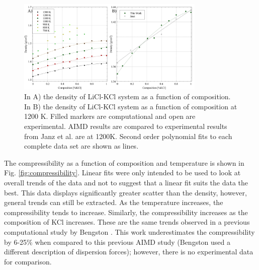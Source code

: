 \documentclass[review]{elsarticle}
\begin{document}
\begin{figure}[h]
 \centering
 \includegraphics[width=0.8\textwidth]{images/denisty_combined_figures.jpg} 
 \caption{In A) the density of LiCl-KCl system as a function of composition. In B) the density of LiCl-KCl system as a function of composition at 1200 K. Filled markers are computational and open are experimental. AIMD results are compared to experimental results from Janz et al. \cite{janz1975molten,van1955electrical} are at 1200K. Second order polynomial fits to each complete data set are shown as lines.}
 \label{fig:density}
\end{figure} 


\FloatBarrier

The compressibility as a function of composition and temperature is shown in Fig. \ref{fig:compressibility}. Linear fits were only intended to be used to look at overall trends of the data and not to suggest that a linear fit suits the data the best. This data displays significantly greater scatter than the density, however, general trends can still be extracted. As the temperature increases, the compressibility tends to increase. Similarly, the compressibility increases as the composition of KCl increases. These are the same trends observed in a previous computational study by Bengston \cite{Bengston2014}. This work underestimates the compressibility by 6-25\% when compared to this previous AIMD study (Bengston used a different description of dispersion forces); however, there is no experimental data for comparison.
\end{document}
